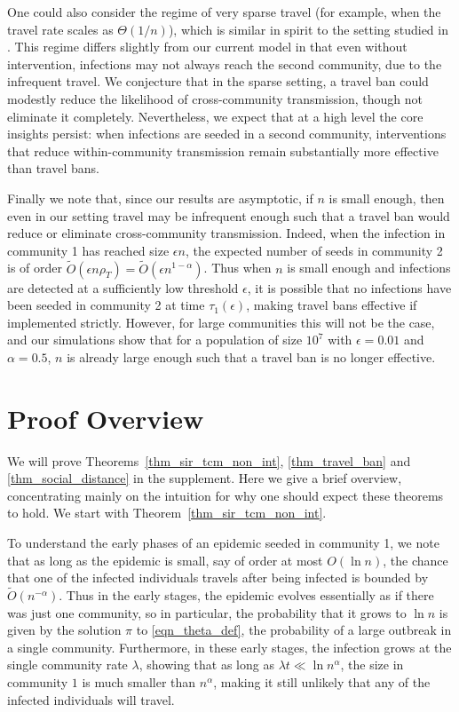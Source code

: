 \documentclass[11pt]{article}
\begin{document}
One could also consider the regime of very sparse travel (for example, when the travel rate scales as $\Theta(1/n)$), which is similar in spirit to the setting studied in \cite{ball2024epidemic}. This regime differs slightly from our current model in that even without intervention, infections may not always reach the second community, due to the infrequent travel. We conjecture that in the sparse setting, a travel ban could modestly reduce the likelihood of cross-community transmission, though not eliminate it completely. Nevertheless, we expect that at a high level the core insights persist: when infections are seeded in a second community, interventions that reduce within-community transmission remain substantially more effective than travel bans.

Finally we note that, since our results are asymptotic, if $n$ is small enough, then even in our setting travel may be infrequent enough such that a travel ban would reduce or eliminate cross-community transmission. Indeed, when the infection in community 1 has reached size $\epsilon n$, the expected number of seeds in community 2 is of order $\tilde O(\epsilon n \rho_T)=\tilde O(\epsilon n^{1-\alpha})$. Thus when $n$ is small enough and infections are detected at a sufficiently low threshold $\epsilon$, it is possible that no infections have been seeded in community 2 at time $\tau_1(\epsilon)$, making travel bans effective if implemented  strictly. However, for large communities this will not be the case, and our simulations show that for a population of size $10^7$ with $\epsilon = 0.01$ and $\alpha=0.5$, $n$ is already large enough such that a travel ban is no longer effective. 


\section{Proof Overview}

We will prove Theorems~\ref{thm_sir_tcm_non_int}, \ref{thm_travel_ban} and \ref{thm_social_distance} in the supplement.  Here we give a brief overview, concentrating mainly on the intuition for why one should expect these theorems to hold.  We start with Theorem~\ref{thm_sir_tcm_non_int}.

To understand the early phases of an epidemic seeded in community 1, we note that as long as the epidemic is small, say of order at most $O(\ln n)$, the chance that one of the infected individuals travels after being infected is bounded by
$\tilde O(n^{-\alpha})$.  Thus in the early stages, the epidemic evolves essentially as if there was just one community, so in particular, the probability that it  grows to $\ln n$  is given by the solution $\pi$ to \eqref{eqn_theta_def}, the probability of a large outbreak in  a single community. Furthermore, in these early stages, the infection grows at the single community rate $\lambda$, showing that as long as $\lambda t\ll \ln n^\alpha$, the size in community $1$ is much smaller than $n^{\alpha}$, making it still unlikely that any of the infected individuals will travel.
\end{document}
